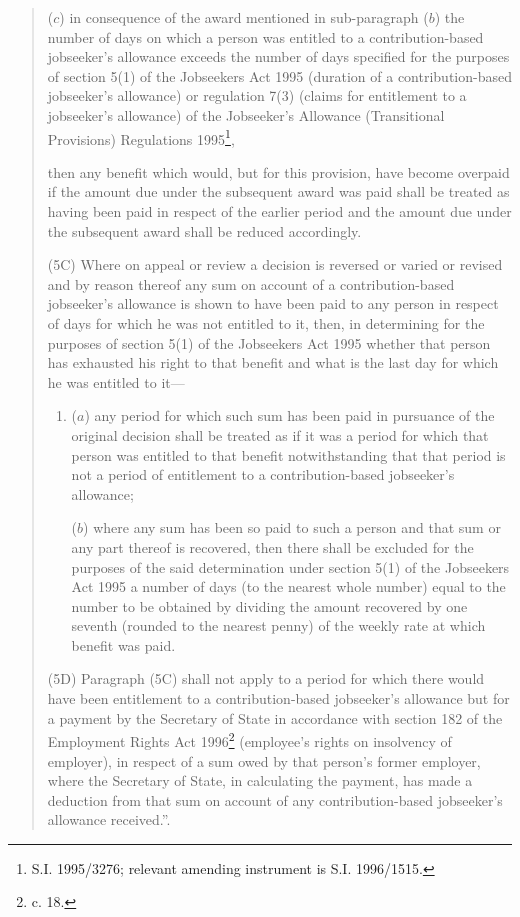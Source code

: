 \documentclass[a4paper]{article}
\begin{document}
\begin{quotation}
\begin{enumerate}
($c$) in consequence of the award mentioned in sub-paragraph ($b$) the number of days on which a person was entitled to a contribution-based jobseeker’s allowance exceeds the number of days specified for the purposes of section 5(1) of the Jobseekers Act 1995 (duration of a contribution-based jobseeker’s allowance) or regulation 7(3) (claims for entitlement to a jobseeker’s allowance) of the Jobseeker’s Allowance (Transitional Provisions) Regulations 1995\footnote{\frenchspacing S.I. 1995/3276; relevant amending instrument is S.I. 1996/1515.},
\end{enumerate}
then any benefit which would, but for this provision, have become overpaid if the amount due under the subsequent award was paid shall be treated as having been paid in respect of the earlier period and the amount due under the subsequent award shall be reduced accordingly.

(5C) Where on appeal or review a decision is reversed or varied or revised and by reason thereof any sum on account of a contribution-based jobseeker’s allowance is shown to have been paid to any person in respect of days for which he was not entitled to it, then, in determining for the purposes of section 5(1) of the Jobseekers Act 1995 whether that person has exhausted his right to that benefit and what is the last day for which he was entitled to it—
\begin{enumerate}\item[]
($a$) any period for which such sum has been paid in pursuance of the original decision shall be treated as if it was a period for which that person was entitled to that benefit notwithstanding that that period is not a period of entitlement to a contribution-based jobseeker’s allowance;

($b$) where any sum has been so paid to such a person and that sum or any part thereof is recovered, then there shall be excluded for the purposes of the said determination under section 5(1) of the Jobseekers Act 1995 a number of days (to the nearest whole number) equal to the number to be obtained by dividing the amount recovered by one seventh (rounded to the nearest penny) of the weekly rate at which benefit was paid.
\end{enumerate}

(5D) Paragraph (5C) shall not apply to a period for which there would have been entitlement to a contribution-based jobseeker’s allowance but for a payment by the Secretary of State in accordance with section 182 of the Employment Rights Act 1996\footnote{ c. 18.} (employee’s rights on insolvency of employer), in respect of a sum owed by that person’s former employer, where the Secretary of State, in calculating the payment, has made a deduction from that sum on account of any contribution-based jobseeker’s allowance received.”.
\end{quotation}
\end{document}
